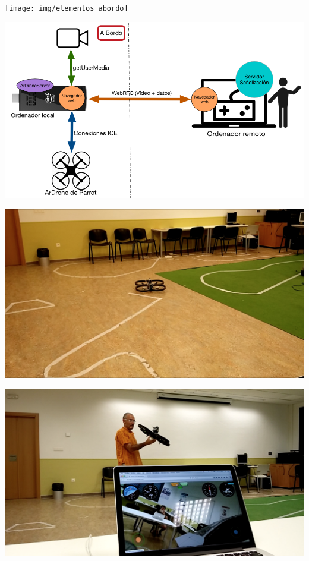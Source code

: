 \documentclass[notes,slidesec,a4]{seminar}
\begin{document}

\begin{hslide}
\begin{minipage}[t]{0.4\textwidth}
\texttt{[image: img/elementos\_abordo]}
\end{minipage}
\begin{minipage}[t]{0.6\textwidth}
\includegraphics[width=\textwidth]{img/esquema_experimento_abordo}
\end{minipage}

\begin{minipage}[t]{0.5\textwidth}
\includegraphics[width=\textwidth]{img/experimento_abordo}
\end{minipage}
\begin{minipage}[t]{0.5\textwidth}
\includegraphics[width=\textwidth]{img/pruebas_experimento_abordo}
\end{minipage}
\end{hslide}
\end{document}
